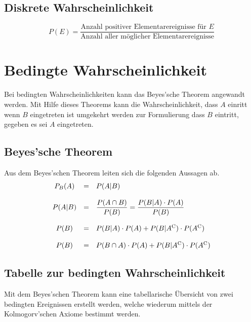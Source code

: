 \subsection{Diskrete Wahrscheinlichkeit}
\[ 
	P(E)
	= \frac{\text{Anzahl positiver Elementarereignisse für } E}{
		\text{Anzahl aller möglicher Elementarereignisse}}
\]

\section{Bedingte Wahrscheinlichkeit}
Bei bedingten Wahrscheinlichkeiten kann das \gls{Beyes'sche Theorem} 
angewandt werden. Mit Hilfe dieses Theorems kann die Wahrscheinlichkeit, 
dass $A$ einritt wenn $B$ eingetreten ist umgekehrt werden zur 
Formulierung dass $B$ eintritt, gegeben es sei $A$ eingetreten.

\subsection{Beyes'sche Theorem}
Aus dem Beyes'schen Theorem leiten sich die folgenden Aussagen ab.
\[ \begin{array}{c c l}
	P_B(A) 
		& = 
		& P(A|B) \\
	& & \\
	P(A|B)
		& = 
		& \displaystyle \frac{P(A \cap B)}{P(B)} 
			= \displaystyle 
			\frac{P(B|A) \cdot P(A)}{P(B)} \\
	& & \\
	P(B) 
		& = 
		& P(B|A) \cdot P(A) 
			+ P(B|A^{\mathrm C}) 
			\cdot P(A^{\mathrm C}) \\
	& & \\
	P(B) 	
		& = 
		& P(B \cap A) \cdot P(A) + P(B|A^{\mathrm C}) 
			\cdot P(A^{\mathrm C})
\end{array} \]

\newpage
\subsection{Tabelle zur bedingten Wahrscheinlichkeit}
Mit dem Beyes'schen Theorem kann eine tabellarische Übersicht von
zwei bedingten Ereignissen erstellt werden, welche wiederum mittels
der Kolmogorv'schen Axiome bestimmt werden.

